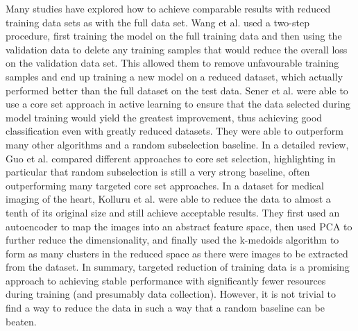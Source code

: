 Many studies have explored how to achieve comparable results with reduced training data sets as with the full data set. Wang et al.\cite{wangDataDropoutOptimizing2018} used a two-step procedure, first training the model on the full training data and then using the validation data to delete any training samples that would reduce the overall loss on the validation data set. This allowed them to remove unfavourable training samples and end up training a new model on a reduced dataset, which actually performed better than the full dataset on the test data. Sener et al.\cite{senerActiveLearningConvolutional2018} were able to use a core set approach in active learning to ensure that the data selected during model training would yield the greatest improvement, thus achieving good classification even with greatly reduced datasets. They were able to outperform many other algorithms and a random subselection baseline. In a detailed review, Guo et al.\cite{guoDeepCoreComprehensiveLibrary2022} compared different approaches to core set selection, highlighting in particular that random subselection is still a very strong baseline, often outperforming many targeted core set approaches. In a dataset for medical imaging of the heart, Kolluru et al.\cite{kolluruLearningFewerImages2021} were able to reduce the data to almost a tenth of its original size and still achieve acceptable results. They first used an autoencoder to map the images into an abstract feature space, then used PCA to further reduce the dimensionality, and finally used the k-medoids algorithm to form as many clusters in the reduced space as there were images to be extracted from the dataset. In summary, targeted reduction of training data is a promising approach to achieving stable performance with significantly fewer resources during training (and presumably data collection). However, it is not trivial to find a way to reduce the data in such a way that a random baseline can be beaten.


